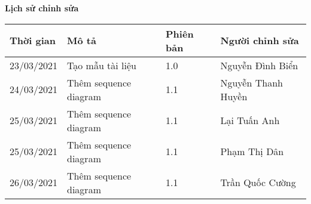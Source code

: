\documentclass[./main.tex]{subfiles}
\begin{document}
	\begin{center}
		\Large{\textbf{Lịch sử chỉnh sửa}}
		\begin{table}[H]
			\begin{tabular}{|p{}|p{}|p{}|p{}|}
				\hline
				\textbf{Thời gian} & \textbf{Mô tả}   & \textbf{Phiên bản} & \textbf{Người chỉnh sửa}                                                 \\ \hline
				23/03/2021 & Tạo mẫu tài liệu & 1.0 & Nguyễn Đình Biển \\ \hline
				24/03/2021 & Thêm sequence diagram & 1.1 & Nguyễn Thanh Huyền \\ \hline
				25/03/2021 & Thêm sequence diagram & 1.1 & Lại Tuấn Anh       \\ \hline
				25/03/2021 & Thêm sequence diagram & 1.1 & Phạm Thị Dân       \\ \hline
				26/03/2021 & Thêm sequence diagram & 1.1 & Trần Quốc Cường \\  \hline
			\end{tabular}
		\end{table}
	\end{center}
	
\end{document}
